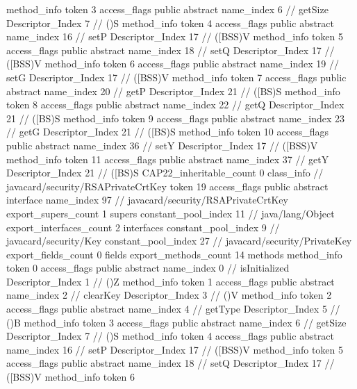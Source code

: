 {{{{{				}
				method_info {
					token	3
					access_flags	public abstract
					name_index	6		// getSize
					Descriptor_Index	7		// ()S
				}
				method_info {
					token	4
					access_flags	public abstract
					name_index	16		// setP
					Descriptor_Index	17		// ([BSS)V
				}
				method_info {
					token	5
					access_flags	public abstract
					name_index	18		// setQ
					Descriptor_Index	17		// ([BSS)V
				}
				method_info {
					token	6
					access_flags	public abstract
					name_index	19		// setG
					Descriptor_Index	17		// ([BSS)V
				}
				method_info {
					token	7
					access_flags	public abstract
					name_index	20		// getP
					Descriptor_Index	21		// ([BS)S
				}
				method_info {
					token	8
					access_flags	public abstract
					name_index	22		// getQ
					Descriptor_Index	21		// ([BS)S
				}
				method_info {
					token	9
					access_flags	public abstract
					name_index	23		// getG
					Descriptor_Index	21		// ([BS)S
				}
				method_info {
					token	10
					access_flags	public abstract
					name_index	36		// setY
					Descriptor_Index	17		// ([BSS)V
				}
				method_info {
					token	11
					access_flags	public abstract
					name_index	37		// getY
					Descriptor_Index	21		// ([BS)S
				}
			}
			CAP22_inheritable_count	0
		}
		class_info {		// javacard/security/RSAPrivateCrtKey
			token	19
			access_flags	public abstract interface
			name_index	97		// javacard/security/RSAPrivateCrtKey
			export_supers_count	1
			supers {
				constant_pool_index	11		// java/lang/Object
			}
			export_interfaces_count	2
			interfaces {
				constant_pool_index	9		// javacard/security/Key
				constant_pool_index	27		// javacard/security/PrivateKey
			}
			export_fields_count	0
			fields {
			}
			export_methods_count	14
			methods {
				method_info {
					token	0
					access_flags	public abstract
					name_index	0		// isInitialized
					Descriptor_Index	1		// ()Z
				}
				method_info {
					token	1
					access_flags	public abstract
					name_index	2		// clearKey
					Descriptor_Index	3		// ()V
				}
				method_info {
					token	2
					access_flags	public abstract
					name_index	4		// getType
					Descriptor_Index	5		// ()B
				}
				method_info {
					token	3
					access_flags	public abstract
					name_index	6		// getSize
					Descriptor_Index	7		// ()S
				}
				method_info {
					token	4
					access_flags	public abstract
					name_index	16		// setP
					Descriptor_Index	17		// ([BSS)V
				}
				method_info {
					token	5
					access_flags	public abstract
					name_index	18		// setQ
					Descriptor_Index	17		// ([BSS)V
				}
				method_info {
					token	6
}}}}}
